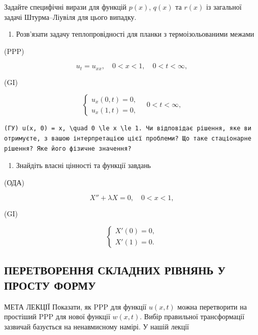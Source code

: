 \documentclass[
  ukrainian,
]{article}
\providecommand{\tightlist}{%
  \setlength{\itemsep}{0pt}\setlength{\parskip}{0pt}}
\begin{document}
Задайте специфічні вирази для функцій \(p(x)\), \(q(x)\) та \(r(x)\) із
загальної задачі Штурма--Ліувіля для цього випадку.

\begin{enumerate}
\def\labelenumi{\arabic{enumi}.}
\setcounter{enumi}{2}
\tightlist
\item
  Розв'язати задачу теплопровідності для планки з термоізольованими
  межами
\end{enumerate}

(PPP)

\[
u_t = u_{xx}, \quad 0 < x < 1, \quad 0 < t < \infty,
\]

(GI)

\[
\begin{cases} u_x (0, t) = 0, \\ u_x (1, t) = 0, \end{cases} \quad 0 < t < \infty,
\]

\begin{verbatim}
(ГУ) u(x, 0) = x, \quad 0 \le x \le 1. Чи відповідає рішення, яке ви отримуєте, з вашою інтерпретацією цієї проблеми? Що таке стаціонарне рішення? Яке його фізичне значення?
\end{verbatim}

\begin{enumerate}
\def\labelenumi{\arabic{enumi}.}
\setcounter{enumi}{3}
\tightlist
\item
  Знайдіть власні цінності та функції завдань
\end{enumerate}

(ОДА)

\[
X'' + \lambda X = 0, \quad 0 < x < 1,
\]

(GI)

\[
\begin{cases} X'(0) = 0, \\ X'(1) = 0. \end{cases}
\]

\subsection{ПЕРЕТВОРЕННЯ СКЛАДНИХ РІВНЯНЬ У ПРОСТУ
ФОРМУ}\label{ux43fux435ux440ux435ux442ux432ux43eux440ux435ux43dux43dux44f-ux441ux43aux43bux430ux434ux43dux438ux445-ux440ux456ux432ux43dux44fux43dux44c-ux443-ux43fux440ux43eux441ux442ux443-ux444ux43eux440ux43cux443}

МЕТА ЛЕКЦІЇ Показати, як PPP для функції \(u(x, t)\) можна перетворити
на простіший PPP для нової функції \(w(x, t)\). Вибір правильної
трансформації зазвичай базується на ненавмисному намірі. У нашій лекції
\end{document}
